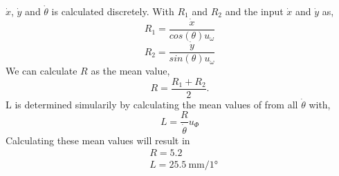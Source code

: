 \documentclass[a4paper,12pt,oneside,onecolumn]{article} %
\begin{document}
$\dot{x}$, $\dot{y}$ and $\dot{\theta}$ is calculated discretely. With
$R_1$ and $R_2$ and the input $\dot{x}$ and $\dot{y}$
as,
	\begin{equation}
		R_1 = \frac{\dot{x}}{cos(\theta)u_\omega}
	\end{equation}
	\begin{equation}
		R_2 = \frac{\dot{y}}{sin(\theta)u_\omega}
	\end{equation}
We can calculate $R$ as the mean value,
	\begin{equation}
		R = \frac{R_1 + R_2}{2}. %
	\end{equation}
L is determined simularily by calculating the mean values of from all
$\dot{\theta}$ with,
	\begin{equation}
		L =  \frac{R}{\dot{\theta}}u_\Phi
	\end{equation}
        Calculating these mean values will result in
	\begin{align*}
          &R = 5.2\\
          &L = 25.5\ \si{\milli\meter/\ang{1}}
	\end{align*}
\end{document}
